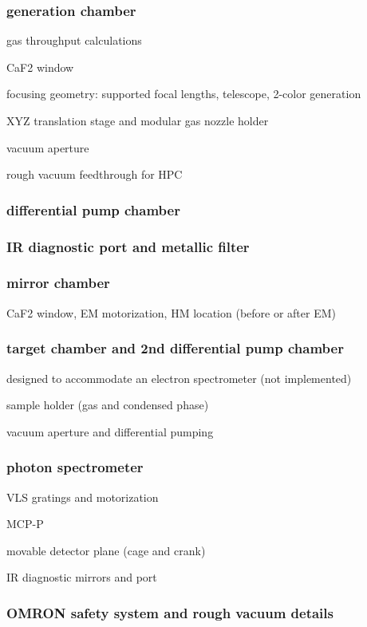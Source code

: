 \subsubsection{generation chamber}
gas throughput calculations

CaF2 window

focusing geometry: supported focal lengths, telescope, 2-color generation

XYZ translation stage and modular gas nozzle holder

vacuum aperture

rough vacuum feedthrough for HPC

\subsubsection{differential pump chamber}

\subsubsection{IR diagnostic port and metallic filter}

\subsubsection{mirror chamber}

CaF2 window, EM motorization, HM location (before or after EM)

\subsubsection{target chamber and 2nd differential pump chamber}

designed to accommodate an electron spectrometer (not implemented)

sample holder (gas and condensed phase)

vacuum aperture and differential pumping

\subsubsection{photon spectrometer}

VLS gratings and motorization

MCP-P

movable detector plane (cage and crank)

IR diagnostic mirrors and port

\subsubsection{OMRON safety system and rough vacuum details}

